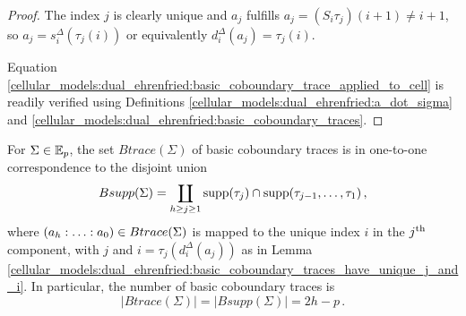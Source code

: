 \begin{proof}
    The index $j$ is clearly unique and $a_j$ fulfills $a_j = (S_i\tau_j)(i+1) \neq i+1$, so $a_j = s_i^\Delta( \tau_j(i) )$ or equivalently $d_i^\Delta(a_j) = \tau_j(i)$.
    
    Equation \eqref{cellular_models:dual_ehrenfried:basic_coboundary_trace_applied_to_cell} is readily verified using Definitions
    \ref{cellular_models:dual_ehrenfried:a_dot_sigma} and \ref{cellular_models:dual_ehrenfried:basic_coboundary_traces}.
\end{proof}

\begin{lem}
    \label{cellular_models:dual_ehrenfried:Btrace_is_Bsupp}
    For $\Sigma \in \mathbb E_p$, the set $Btrace(\Sigma)$ of basic coboundary traces is in one-to-one correspondence to the disjoint union
    \[
        Bsupp(\Sigma) = \coprod_{h \ge j \ge 1} \supp(\tau_j) \cap \supp(\tau_{j-1}, \ldots, \tau_1) \,,
    \]
    where $\homog[a] \in Btrace(\Sigma)$ is mapped to the unique index $i$ in the $j^{\text{th}}$ component,
    with $j$ and $i = \tau_j( d_i^\Delta(a_j) )$ as in Lemma \ref{cellular_models:dual_ehrenfried:basic_coboundary_traces_have_unique_j_and_i}.
    In particular, the number of basic coboundary traces is
    \[
        |Btrace(\Sigma)| = |Bsupp(\Sigma)| = 2h-p \,.
    \]
\end{lem}

